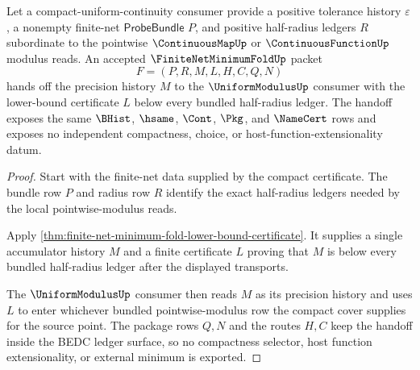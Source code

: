 \begin{theorem}
\label{thm:finite-net-minimum-fold-uniform-modulus-handoff}
Let a compact-uniform-continuity consumer provide a positive tolerance history $\varepsilon$, a nonempty finite-net $\mathsf{ProbeBundle}$ $P$, and positive half-radius ledgers $R$ subordinate to the pointwise $\ContinuousMapUp$ or $\ContinuousFunctionUp$ modulus reads. An accepted $\FiniteNetMinimumFoldUp$ packet
$$
F=(P,R,M,L,H,C,Q,N)
$$
hands off the precision history $M$ to the $\UniformModulusUp$ consumer with the lower-bound certificate $L$ below every bundled half-radius ledger. The handoff exposes the same $\BHist$, $\hsame$, $\Cont$, $\Pkg$, and $\NameCert$ rows and exposes no independent compactness, choice, or host-function-extensionality datum.
\end{theorem}
\begin{proof}
Start with the finite-net data supplied by the compact certificate. The bundle row $P$ and radius row $R$ identify the exact half-radius ledgers needed by the local pointwise-modulus reads.

Apply \autoref{thm:finite-net-minimum-fold-lower-bound-certificate}. It supplies a single accumulator history $M$ and a finite certificate $L$ proving that $M$ is below every bundled half-radius ledger after the displayed transports.

The $\UniformModulusUp$ consumer then reads $M$ as its precision history and uses $L$ to enter whichever bundled pointwise-modulus row the compact cover supplies for the source point. The package rows $Q,N$ and the routes $H,C$ keep the handoff inside the BEDC ledger surface, so no compactness selector, host function extensionality, or external minimum is exported.
\end{proof}


